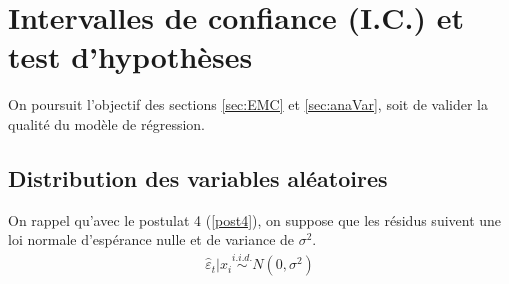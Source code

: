 \documentclass[11pt,french]{report}
\begin{document}

\section{Intervalles de confiance (I.C.) et test d'hypothèses}
On poursuit l'objectif des sections \ref{sec:EMC} et \ref{sec:anaVar}, soit de valider la qualité du modèle de régression.

\subsection{Distribution des variables aléatoires}
\label{sec:distri}
On rappel qu'avec le postulat 4 (\ref{post4}), on suppose que les résidus suivent une loi normale d'espérance nulle et de variance de $\sigma^2$.
	\begin{align*}
\hat{\varepsilon}_t|x_i \overset{i.i.d.}{\sim} N(0, \sigma^2)
	\end{align*}
\end{document}
